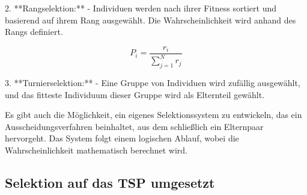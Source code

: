 2. **Rangselektion:**
- Individuen werden nach ihrer Fitness sortiert und basierend 
auf ihrem Rang ausgewählt. Die Wahrscheinlichkeit wird anhand 
des Rangs definiert.

\begin{equation}
    \label{eq:probability_rating}
    P_i = \frac{r_i}{\sum_{j=1}^{N} r_j}
\end{equation}

3. **Turnierselektion:**
- Eine Gruppe von Individuen wird zufällig ausgewählt, und 
das fitteste Individuum dieser Gruppe wird als Elternteil gewählt.

Es gibt auch die Möglichkeit, ein eigenes Selektionssystem zu entwickeln, 
das ein Ausscheidungsverfahren beinhaltet, aus dem schließlich ein 
Elternpaar hervorgeht. Das System folgt einem logischen Ablauf, wobei 
die Wahrscheinlichkeit mathematisch berechnet wird.

\subsection{Selektion auf das TSP umgesetzt
\label{buch:paper:varalg:subsection:selection_tsp}}
